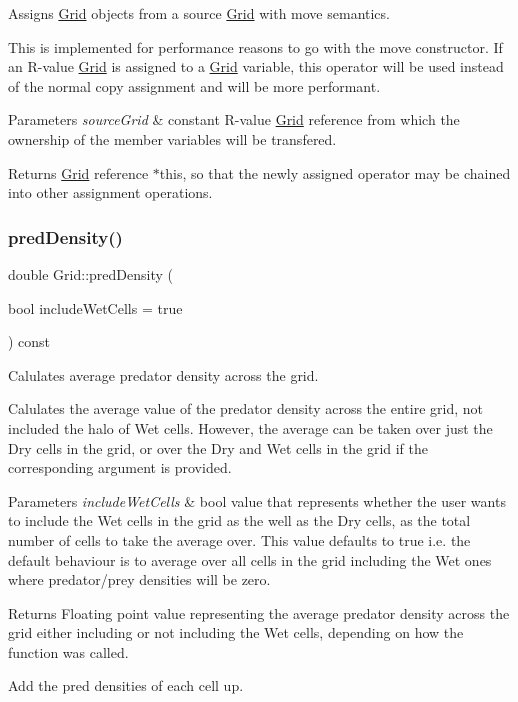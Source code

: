 Assigns \hyperlink{class_grid}{Grid} objects from a source \hyperlink{class_grid}{Grid} with move semantics. 

This is implemented for performance reasons to go with the move constructor. If an R-\/value \hyperlink{class_grid}{Grid} is assigned to a \hyperlink{class_grid}{Grid} variable, this operator will be used instead of the normal copy assignment and will be more performant.


\begin{DoxyParams}{Parameters}
{\em source\+Grid} & constant R-\/value \hyperlink{class_grid}{Grid} reference from which the ownership of the member variables will be transfered.\\
\hline
\end{DoxyParams}
\begin{DoxyReturn}{Returns}
\hyperlink{class_grid}{Grid} reference $\ast$this, so that the newly assigned operator may be chained into other assignment operations. 
\end{DoxyReturn}
\mbox{\label{class_grid_a25eeb1fef1d86fe74b45e615f0376158}} 
\subsubsection{\texorpdfstring{pred\+Density()}{predDensity()}}
{\footnotesize\ttfamily double Grid\+::pred\+Density (\begin{DoxyParamCaption}\item[{bool}]{include\+Wet\+Cells = {\ttfamily true} }\end{DoxyParamCaption}) const}



Calulates average predator density across the grid. 

Calulates the average value of the predator density across the entire grid, not included the halo of Wet cells. However, the average can be taken over just the Dry cells in the grid, or over the Dry and Wet cells in the grid if the corresponding argument is provided.


\begin{DoxyParams}{Parameters}
{\em include\+Wet\+Cells} & bool value that represents whether the user wants to include the Wet cells in the grid as the well as the Dry cells, as the total number of cells to take the average over. This value defaults to true i.\+e. the default behaviour is to average over all cells in the grid including the Wet ones where predator/prey densities will be zero.\\
\hline
\end{DoxyParams}
\begin{DoxyReturn}{Returns}
Floating point value representing the average predator density across the grid either including or not including the Wet cells, depending on how the function was called. 
\end{DoxyReturn}
Add the pred densities of each cell up.

